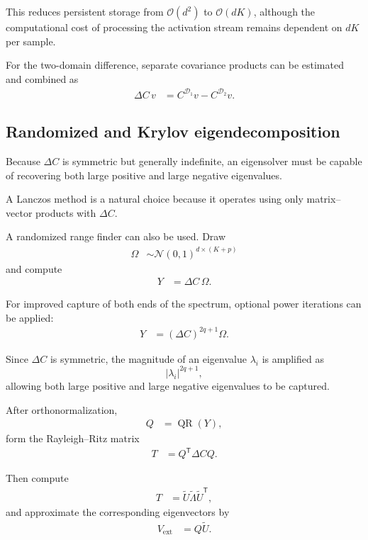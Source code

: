 \documentclass[11pt,a4paper]{article}
\begin{document}
This reduces persistent storage from
$\mathcal{O}(d^2)$ to $\mathcal{O}(dK)$, although the computational cost
of processing the activation stream remains dependent on $dK$ per
sample.

For the two-domain difference, separate covariance products can be
estimated and combined as
\begin{align}
\Delta C\,v
&=
C^{\mathcal{D}_1}v
-
C^{\mathcal{D}_2}v.
\end{align}

\subsection{Randomized and Krylov eigendecomposition}

Because $\Delta C$ is symmetric but generally indefinite, an eigensolver
must be capable of recovering both large positive and large negative
eigenvalues.

A Lanczos method is a natural choice because it operates using only
matrix--vector products with $\Delta C$.

A randomized range finder can also be used. Draw
\begin{align}
\Omega
&\sim
\mathcal{N}(0,1)^{d\times(K+p)}
\end{align}
and compute
\begin{align}
Y
&=
\Delta C\,\Omega.
\end{align}

For improved capture of both ends of the spectrum, optional power
iterations can be applied:
\begin{align}
Y
&=
(\Delta C)^{2q+1}\Omega.
\end{align}

Since $\Delta C$ is symmetric, the magnitude of an eigenvalue
$\lambda_i$ is amplified as
\[
|\lambda_i|^{2q+1},
\]
allowing both large positive and large negative eigenvalues to be
captured.

After orthonormalization,
\begin{align}
Q
&=
\operatorname{QR}(Y),
\end{align}
form the Rayleigh--Ritz matrix
\begin{align}
T
&=
Q^{\mathsf T}\Delta C Q.
\end{align}

Then compute
\begin{align}
T
&=
\widetilde U
\widetilde\Lambda
\widetilde U^{\mathsf T},
\end{align}
and approximate the corresponding eigenvectors by
\begin{align}
V_{\mathrm{ext}}
&=
Q\widetilde U.
\end{align}
\end{document}
